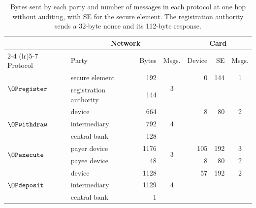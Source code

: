 \begin{table}[htbp] \centering \small \setlength{\tabcolsep}{5pt}
\begin{tabular}{llrcrrc} \toprule
& \multicolumn{3}{c}{Network} & \multicolumn{3}{c}{Card} \\
\cmidrule(lr){2-4} \cmidrule(lr){5-7}
Protocol & Party & Bytes & Msgs. & Device & SE & Msgs. \\ \midrule
\multirow{2}{*}{$\OPregister$} & secure element & 192 & \multirow{2}{*}{3} & 0 & 144 & 1 \\
& registration authority & 144 & & & & \\ \midrule
\multirow{3}{*}{$\OPwithdraw$} & device & 664 & \multirow{3}{*}{4} & 8 & 80 & 2 \\
& intermediary & 792 & & & & \\
& central bank & 128 & & & & \\ \midrule
\multirow{2}{*}{$\OPexecute$} & payer device & 1176 & \multirow{2}{*}{3} & 105 & 192 & 3 \\
& payee device & 48 & & 8 & 80 & 2 \\ \midrule
\multirow{3}{*}{$\OPdeposit$} & device & 1128 & \multirow{3}{*}{4} & 57 & 192 & 2 \\
& intermediary & 1129 & & & & \\
& central bank & 1 & & & & \\
\bottomrule \end{tabular} \caption[Offline payments: communication]{Bytes sent
by each party and number of messages in each protocol at one hop without
auditing, with SE for the secure element. The registration authority sends a
32-byte nonce and its 112-byte response.} \label{tab:offline-comms} \end{table}
